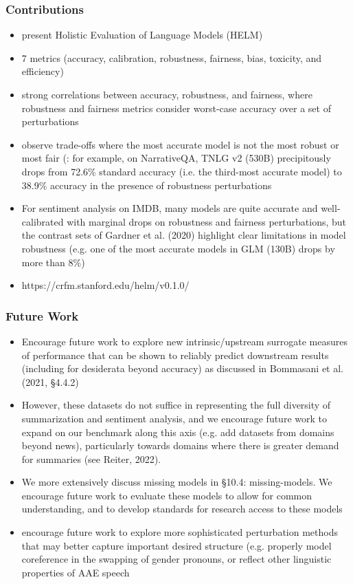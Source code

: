 \documentclass{article}
\begin{document}
\begin{flushleft}
\subsubsection*{Contributions}
\begin{itemize}
    \item present Holistic Evaluation of Language Models (HELM) 
 \item  7 metrics (accuracy, calibration, robustness, fairness, bias, toxicity, and efficiency) 
 \item strong correlations between accuracy, robustness, and fairness, where robustness and fairness metrics consider worst-case accuracy over a set of perturbations
 \item observe trade-offs where the most accurate model is not the most robust or
most fair (: for example, on NarrativeQA, TNLG v2 (530B) precipitously drops from 72.6\% standard accuracy (i.e. the third-most accurate model) to 38.9\% accuracy in the presence of robustness perturbations
\item  For sentiment analysis on IMDB, many models are quite accurate
and well-calibrated with marginal drops on robustness and fairness perturbations, but the
contrast sets of Gardner et al. (2020) highlight clear limitations in model robustness (e.g. one of the most accurate models in GLM (130B) drops by more than 8\%)
 \item  https://crfm.stanford.edu/helm/v0.1.0/ 
\end{itemize}

\subsubsection*{Future Work}
\begin{itemize}
    \item Encourage future work to explore new intrinsic/upstream surrogate measures of performance that can be shown to reliably predict downstream results (including for desiderata beyond accuracy) as discussed in Bommasani et al. (2021, §4.4.2)
    \item However, these datasets do not suffice in representing the full diversity of summarization and sentiment analysis, and we encourage future work to expand on our benchmark along this axis (e.g. add datasets from domains beyond news), particularly towards domains where there is greater demand for summaries (see Reiter, 2022).
    \item We more extensively discuss missing models in §10.4: missing-models. We encourage future work to evaluate these models to allow for common understanding, and to develop standards for research access to these models
    \item  encourage future work to explore more sophisticated perturbation methods that may better capture important desired structure (e.g. properly model coreference in the swapping of gender pronouns, or reflect other linguistic properties of AAE speech
\end{itemize}


\end{flushleft}
\end{document}
